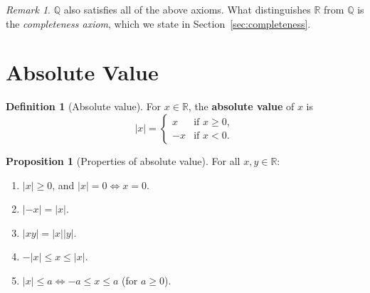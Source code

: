 \documentclass[12pt,a4paper,openany]{book}
\newcommand{\Q}{\mathbb{Q}}
\newcommand{\R}{\mathbb{R}}
\newcommand{\abs}[1]{\left\lvert #1 \right\rvert}
\theoremstyle{definition}
\newtheorem{definition}{Definition}[chapter]
\newtheorem{proposition}{Proposition}[chapter]
\theoremstyle{remark}
\newtheorem{remark}{Remark}[chapter]
\begin{document}
\begin{remark}
$\Q$ also satisfies all of the above axioms.  What distinguishes $\R$ from
$\Q$ is the \emph{completeness axiom}, which we state in
Section~\ref{sec:completeness}.
\end{remark}

\section{Absolute Value}
\label{sec:absolute-value}

\begin{definition}[Absolute value]\label{def:abs-value}
For $x \in \R$, the \textbf{absolute value} of $x$ is
\[
  \abs{x} = \begin{cases} x & \text{if } x \geq 0, \\ -x & \text{if } x < 0. \end{cases}
\]
\end{definition}

\begin{proposition}[Properties of absolute value]\label{prop:abs-props}
For all $x,y \in \R$:
\begin{enumerate}[label=(\roman*)]
  \item $\abs{x} \geq 0$, and $\abs{x}=0 \iff x=0$.
  \item $\abs{-x}=\abs{x}$.
  \item $\abs{xy}=\abs{x}\abs{y}$.
  \item \label{item:abs-ineq} $-\abs{x} \leq x \leq \abs{x}$.
  \item $\abs{x} \leq a \iff -a \leq x \leq a$ \quad (for $a \geq 0$).
\end{enumerate}
\end{proposition}
\end{document}
